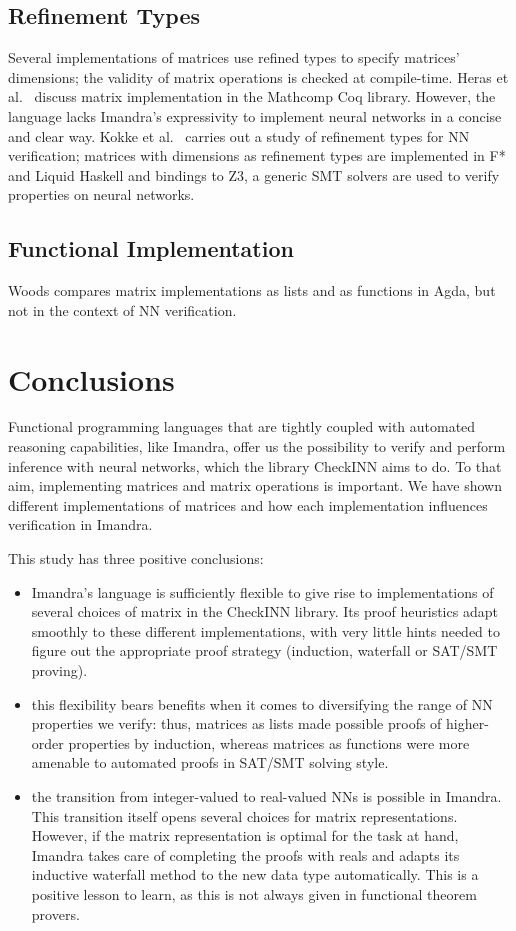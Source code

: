 \documentclass[runningheads]{llncs}
\begin{document}
\subsection{Refinement Types}
Several implementations of matrices use refined types to specify matrices' dimensions; the validity of matrix operations is checked at compile-time.
Heras et al.~\cite{heras_incidence_2011} discuss matrix implementation in the Mathcomp Coq library. However, the language lacks Imandra's expressivity to implement neural networks in a concise and clear way.
Kokke et al.~\cite{kokke_neural_2020} carries out a study of refinement types for NN verification; matrices with dimensions as refinement types are implemented in F* and Liquid Haskell and bindings to Z3, a generic SMT solvers are used to verify properties on neural networks.

\subsection{Functional Implementation}

Woods \cite{wood_vectors_2019} compares matrix implementations as lists and as functions in Agda, but not in the context of NN verification.
\fi


\section{Conclusions}
Functional programming languages that are tightly coupled with automated reasoning capabilities, like Imandra, offer us the possibility to verify and perform inference with neural networks, which the library CheckINN aims to do. To that aim, implementing matrices and matrix operations is important.
We have shown different implementations of matrices and how each implementation influences verification in Imandra.

This study has three positive conclusions:
\begin{itemize}
\item Imandra's language is sufficiently flexible to give rise to implementations of several choices of matrix in the CheckINN library. Its proof heuristics adapt smoothly to these different implementations, with very little hints needed to figure out the appropriate proof strategy (induction, waterfall or SAT/SMT proving).

\item this flexibility bears benefits when it comes to diversifying the range of NN properties we verify: thus, matrices as lists made possible proofs of higher-order properties by induction, whereas matrices as functions were more amenable to automated proofs in SAT/SMT solving style.

\item the transition from integer-valued to real-valued NNs is possible in Imandra. This transition itself opens several choices for matrix representations. However, if the matrix representation is optimal for the task at hand, Imandra takes care of completing the proofs with reals and adapts its inductive waterfall method to the new data type automatically.
  This is a positive lesson to learn, as this is not always given in functional theorem provers.
\end{itemize}
\end{document}
